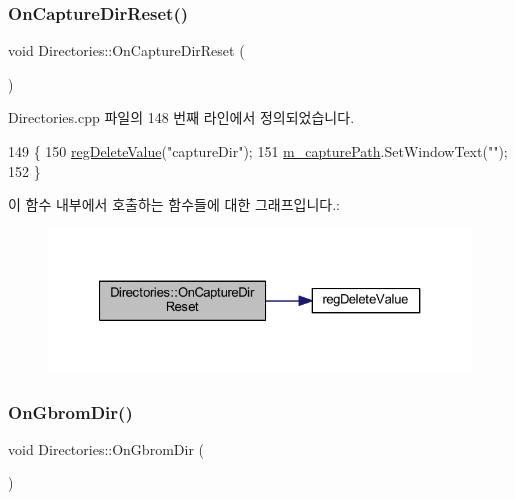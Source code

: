 \subsubsection{\texorpdfstring{On\+Capture\+Dir\+Reset()}{OnCaptureDirReset()}}
{\footnotesize\ttfamily void Directories\+::\+On\+Capture\+Dir\+Reset (\begin{DoxyParamCaption}{ }\end{DoxyParamCaption})\hspace{0.3cm}{\ttfamily [protected]}}



Directories.\+cpp 파일의 148 번째 라인에서 정의되었습니다.


\begin{DoxyCode}
149 \{
150   \mbox{\hyperlink{_reg_8cpp_aa7b7490d17e18a60838a58482114fd75}{regDeleteValue}}(\textcolor{stringliteral}{"captureDir"});
151   \mbox{\hyperlink{class_directories_a4010cf261f54e1477c6587395fd055d4}{m\_capturePath}}.SetWindowText(\textcolor{stringliteral}{""});  
152 \}
\end{DoxyCode}
이 함수 내부에서 호출하는 함수들에 대한 그래프입니다.\+:
\nopagebreak
\begin{figure}[H]
\begin{center}
\leavevmode
\includegraphics[width=327pt]{class_directories_a2e98e0696392fcd819f48ac56012c35d_cgraph}
\end{center}
\end{figure}
\mbox{\label{class_directories_acb13ecb0add4c5e10ed47d40d6a8605c}} 
\subsubsection{\texorpdfstring{On\+Gbrom\+Dir()}{OnGbromDir()}}
{\footnotesize\ttfamily void Directories\+::\+On\+Gbrom\+Dir (\begin{DoxyParamCaption}{ }\end{DoxyParamCaption})\hspace{0.3cm}{\ttfamily [protected]}}



